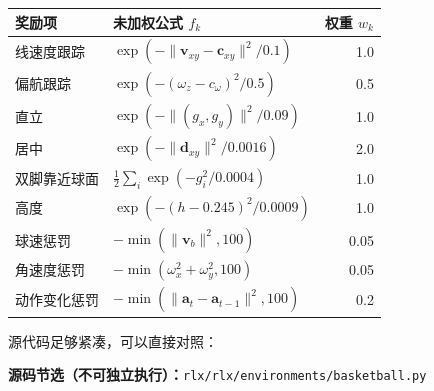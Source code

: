 \documentclass[
  chinese,
  11pt,
  letterpaper,
]{article}
\newcounter{none} %
\begin{document}
{\def\LTcaptype{none} %
\begin{longtable}[]{@{}llr@{}}
\toprule\noalign{}
奖励项 & 未加权公式 \(f_k\) & 权重 \(w_k\) \\
\midrule\noalign{}
\endhead
\bottomrule\noalign{}
\endlastfoot
线速度跟踪 & \(\exp(-\|\mathbf v_{xy}-\mathbf c_{xy}\|^2/0.1)\) & 1.0 \\
偏航跟踪 & \(\exp(-(\omega_z-c_\omega)^2/0.5)\) & 0.5 \\
直立 & \(\exp(-\|(g_x,g_y)\|^2/0.09)\) & 1.0 \\
居中 & \(\exp(-\|\mathbf d_{xy}\|^2/0.0016)\) & 2.0 \\
双脚靠近球面 & \(\frac12\sum_i\exp(-g_i^2/0.0004)\) & 1.0 \\
高度 & \(\exp(-(h-0.245)^2/0.0009)\) & 1.0 \\
球速惩罚 & \(-\min(\|\mathbf v_b\|^2,100)\) & 0.05 \\
角速度惩罚 & \(-\min(\omega_x^2+\omega_y^2,100)\) & 0.05 \\
动作变化惩罚 & \(-\min(\|\mathbf a_t-\mathbf a_{t-1}\|^2,100)\) & 0.2 \\
\end{longtable}
}

源代码足够紧凑，可以直接对照：

\textbf{源码节选（不可独立执行）：}\texttt{rlx/\allowbreak{}rlx/\allowbreak{}environm\allowbreak{}ents/\allowbreak{}basketba\allowbreak{}ll.py}
\end{document}
